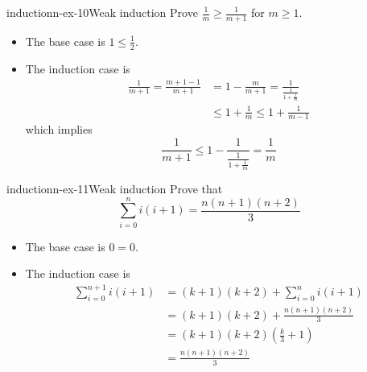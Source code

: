 \documentclass[preview]{standalone}
\begin{document}
\begin{snippetexercise}{inductionn-ex-10}{Weak induction}
    Prove \(\frac{1}{m} \geq \frac{1}{m+1}\)
    for \(m \geq 1\).
    \begin{itemize}
        \item The base case is \(1 \leq \frac{1}{2}\).
        \item The induction case is
        \begin{align*}
            \frac{1}{m+1} = \frac{m+1-1}{m+1} &= 1- \frac{m}{m+1} = \frac{1}{\displaystyle \frac{1}{1 + \frac{1}{m}}} \\
            & \leq 1 + \frac{1}{m} \leq 1 + \frac{1}{m-1}
        \end{align*}
        which implies
        \[
            \frac{1}{m+1} \leq 1 - \frac{1}{\displaystyle \frac{1}{1 + \frac{1}{m}}} = \frac{1}{m}
        \]
    \end{itemize}
\end{snippetexercise}

\begin{snippetexercise}{inductionn-ex-11}{Weak induction}
    Prove that
    \[
        \sum_{i=0}^n i(i+1) = \frac{n(n+1)(n+2)}{3}
    \]
    \begin{itemize}
        \item The base case is \(0 = 0\).
        \item The induction case is
        \begin{align*}
            \sum_{i=0}^{n+1} i(i+1) &= (k+1)(k+2) + \sum_{i=0}^n i(i+1) \\ 
            &= (k+1)(k+2) + \frac{n(n+1)(n+2)}{3} \\
            &= (k+1)(k+2)\left(\frac{k}{3} + 1\right) \\
            &= \frac{n(n+1)(n+2)}{3}
        \end{align*}
    \end{itemize}
\end{snippetexercise}

\end{document}
